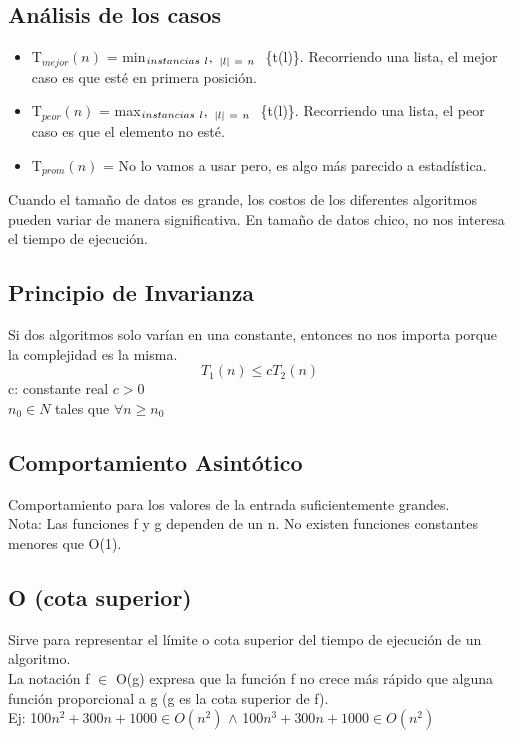 \documentclass[10pt,a4paper]{article}
\begin{document}
\subsection*{Análisis de los casos}
\begin{itemize}
    \item T\(_{mejor}(n)\) = min\(_{instancias \ l},\ _{\longitud{l} \ = \ n}\ \) \{t(l)\}. Recorriendo una lista, el mejor caso es que esté en primera posición.
    \item T\(_{peor}(n)\) = max\(_{instancias \ l},\ _{\longitud{l} \ = \ n}\ \) \{t(l)\}. Recorriendo una lista, el peor caso es que el elemento no esté.
    \item T\(_{prom}(n)\) = No lo vamos a usar pero, es algo más parecido a estadística.
\end{itemize}
Cuando el tamaño de datos es grande, los costos de los diferentes algoritmos pueden variar de manera significativa. En tamaño de datos chico, no nos interesa el tiempo de ejecución.
\subsection*{Principio de Invarianza}
Si dos algoritmos solo varían en una constante, entonces no nos importa porque la complejidad es la misma.
\[T_{1}(n) \le cT_{2}(n)\]
c: constante real  \(c>0\) \\
\(n_{0} \in N\) tales que \(\forall n \ge n_{0}\)
\subsection*{Comportamiento Asintótico}
Comportamiento para los valores de la entrada suficientemente grandes. \\
Nota: Las funciones f y g dependen de un n. No existen funciones constantes menores que O(1).
\subsection*{O (cota superior)}
Sirve para representar el límite o cota superior del tiempo de ejecución de un algoritmo. \\
La notación f \(\in\) O(g) expresa que la función f no crece más rápido que alguna función proporcional a g (g es la cota superior de f). \\
Ej: 100\(n^{2} + 300n + 1000 \in O(n^{2})\) \(\land\) 100\(n^{3} + 300n + 1000 \in O(n^{2})\) \\ \\
\end{document}
